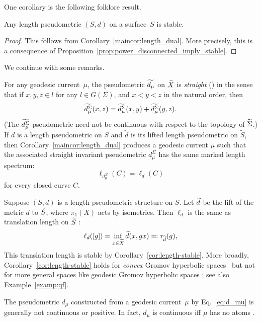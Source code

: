 One corollary is the following folklore result.

\begin{corollary}\label{cor:length-stable}
  Any length pseudometric $(S,d)$ on a surface~$S$ is stable.
\end{corollary}

\begin{proof}
  This follows from Corollary~\ref{maincor:length_dual}. More
  precisely, this is a consequence of
  Proposition~\ref{prop:power_disconnected_imply_stable}.
\end{proof}

We continue with some remarks.

\begin{remark}\label{rmk:pseudo_metrics}
 For any geodesic current~$\mu$, the pseudometric $\widetilde{d_\mu}$ on $\widetilde{X}$ is
 \emph{straight} (\cite[Proposition~4.1]{BIPP21:Systoles}) in the
 sense that if $x,y,z \in l$ for any $l \in G(\Sigma)$, and $x<y<z$ in
 the natural order, then
\[
\widetilde{d_\mu^\Sigma}(x,z)=\widetilde{d_\mu^\Sigma}(x,y)+\widetilde{d_\mu^\Sigma}(y,z).
\]
(The $\widetilde{d_\mu^\Sigma}$ pseudometric need not be continuous with respect to the topology of $\widetilde{\Sigma}$.)
If $d$ is a length pseudometric on $S$ and
$\widetilde d$ is its lifted length pseudometric on $\widetilde S$,
then Corollary~\ref{maincor:length_dual} produces a geodesic current $\mu$ such that the
associated straight invariant pseudometric $d^\Sigma_\mu$ has the
same marked length spectrum:
\[
\ell_{d^\Sigma_\mu}(C)=\ell_d(C)
\]
for every closed curve $C$.
\end{remark}

\begin{remark}
Suppose $(S,d)$ is a length pseudometric structure on $S$. Let
$\widetilde{d}$ be the lift of the metric $d$ to $\widetilde{S}$, where $\pi_1(X)$
acts by isometries. Then $\ell_d$ is the same
as translation length on $\widetilde{S}$
\cite[8.3.13]{BBI01:MetricGeometry}:
\[\ell_d([g])=\inf_{x \in \widetilde{X}} \widetilde{d}(x, g x) \eqqcolon \tau_{\widetilde{d}}(g),\]
This translation length is stable by Corollary~\ref{cor:length-stable}.
More broadly,
Corollary~\ref{cor:length-stable} holds for \emph{convex} Gromov
hyperbolic spaces~\cite[Section~2.6]{Gromov1981HyperbolicManifolds}
but not for more general spaces like geodesic Gromov hyperbolic
spaces \cite[Proposition~6.4]{CDP90:Lectures}; see also Example~\ref{examp:qf}.
\end{remark}

\begin{remark}
  The pseudometric $d_\mu$ constructed from a geodesic current~$\mu$
  by Eq.~\eqref{eq:d_mu} is generally not continuous or positive. In
  fact, $d_\mu$ is continuous iff $\mu$ has no atoms
  \cite[Propositions~4.7, 4.12]{dRMG22:Duals}.
\end{remark}

